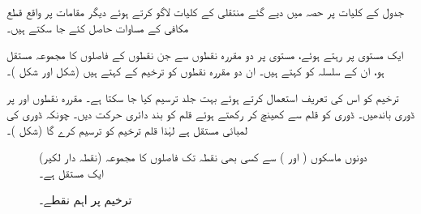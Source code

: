 جدول  کے کلیات پر حصہ  میں دیے گئے منتقلی کے کلیات لاگو کرتے ہوئے دیگر مقامات پر واقع قطع مکافی کے مساوات حاصل کئے جا سکتے ہیں۔

ایک مستوی پر رہتے ہوئے، مستوی پر دو مقررہ نقطوں سے جن نقطوں کے فاصلوں کا مجموعہ مستقل ہو، ان کے سلسلہ کو  کہتے ہیں۔ ان دو مقررہ نقطوں کو ترخیم کے  کہتے ہیں (شکل  اور شکل )۔

ترخیم کو اس کی تعریف استعمال کرتے ہوئے بہت جلد ترسیم کیا جا سکتا ہے۔ مقررہ نقطوں  اور  پر ڈوری باندھیں۔ ڈوری کو قلم سے کھینچ کر رکھتے ہوئے قلم کو بند دائری حرکت دیں۔ چونکہ ڈوری کی لمبائی مستقل ہے لہٰذا قلم ترخیم کو ترسیم کرے گا (شکل )۔

\begin{figure}
\centering
\begin{minipage}{0.45\textwidth}
\centering
{}
\caption{دونوں ماسکوں ( اور ) سے کسی بھی نقطہ  تک فاصلوں کا مجموعہ (نقطہ دار لکیر) ایک مستقل ہے۔}
\label{شکل_مخروط_ترخیم_کی_تعریف}
\end{minipage}\hfill
\begin{minipage}{0.45\textwidth}
\centering
{}
\caption{ترخیم پر اہم نقطے۔}
\label{شکل_مخروط_ترخیم_اہم_نقطے}
\end{minipage}
\end{figure}

